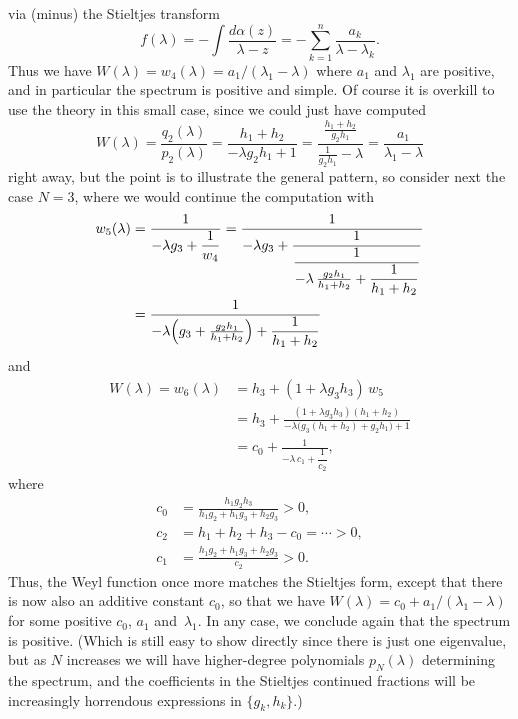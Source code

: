 \documentclass[10pt,a4paper]{article} \pdfoutput=1 
\begin{document}
via (minus) the Stieltjes transform
\begin{equation*}
  f(\lambda) = - \int \frac{d\alpha(z)}{\lambda - z}
  = - \sum_{k=1}^n \frac{a_k}{\lambda - \lambda_k}
  .
\end{equation*}
Thus we have $W(\lambda) = w_4(\lambda) = a_1 / (\lambda_1 - \lambda)$ where $a_1$ and $\lambda_1$ are positive,
and in particular the spectrum is positive and simple.
Of course it is overkill to use the theory in this small case, since we could just have computed
\begin{equation*}
  W(\lambda) = \frac{q_2(\lambda)}{p_2(\lambda)} = \frac{h_1+h_2}{- \lambda g_2 h_1 + 1}
  = \frac{\frac{h_1+h_2}{g_2 h_1}}{\frac{1}{g_2 h_1} - \lambda}
  = \frac{a_1}{\lambda_1 - \lambda}
\end{equation*}
right away, but the point is to illustrate the general pattern, so consider next the case $N=3$,
where we would continue the computation with
\begin{equation*}
  \begin{split}
    w_5(\lambda)
    &
    = \frac{1}{-\lambda g_3 + \dfrac{1}{w_4}}
    = \frac{1}{-\lambda g_3 + \dfrac{1}{\dfrac{1}{- \lambda \, \frac{g_2 h_1}{h_1 + h_2} + \dfrac{1}{h_1 + h_2}}
      }}
    \\ &
    = \frac{1}{-\lambda \Bigl( g_3 + \frac{g_2 h_1}{h_1 + h_2} \Bigr) + \dfrac{1}{h_1 + h_2}}
  \end{split}
\end{equation*}
and
\begin{equation*}
  \begin{split}
    W(\lambda)
    = w_6(\lambda)
    &
    = h_3 + (1 + \lambda g_3 h_3) \, w_5
    \\ &
    = h_3 + \frac{(1 + \lambda g_3 h_3) (h_1+h_2)}{-\lambda \bigl( g_3 (h_1+h_2) + g_2 h_1 \bigr) + 1}
    \\ &
    = c_0 + \frac{1}{- \lambda \, c_1 + \dfrac{1}{c_2}}
    ,
  \end{split}
\end{equation*}
where
\begin{equation*}
  \begin{aligned}
    c_0 &= \frac{h_1 g_2 h_3}{h_1 g_2 + h_1 g_3 + h_2 g_3} > 0
    ,\\
    c_2 &= h_1 + h_2 + h_3 - c_0 = \dotsb > 0
    ,\\
    c_1 &= \frac{h_1 g_2 + h_1 g_3 + h_2 g_3}{c_2} > 0
    .
  \end{aligned}
\end{equation*}
Thus, the Weyl function once more matches the Stieltjes form,
except that there is now also an additive constant $c_0$,
so that we have $W(\lambda) = c_0 + a_1/(\lambda_1 - \lambda)$
for some positive $c_0$, $a_1$ and~$\lambda_1$.
In any case, we conclude again that the spectrum is positive.
(Which is still easy to show directly since there is just one eigenvalue,
but as $N$ increases we will have higher-degree polynomials $p_N(\lambda)$
determining the spectrum, and the coefficients in the Stieltjes continued fractions
will be increasingly horrendous expressions in $\{ g_k, h_k \}$.)
\end{document}
